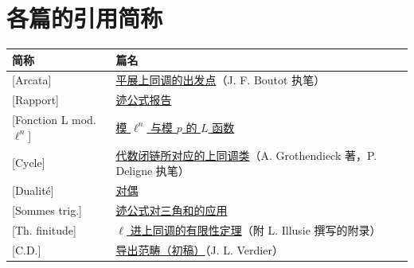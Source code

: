 \section*{各篇的引用简称}
\begin{longtable}{@{}p{.23\linewidth}p{.70\linewidth}@{}}
\toprule
\textbf{简称} & \textbf{篇名}\\\midrule
{[Arcata]} & \hyperref[I]{平展上同调的出发点}（J. F. Boutot 执笔）\\[3pt]
{[Rapport]} & \hyperref[II]{迹公式报告}\\[3pt]
{[Fonction L mod.$\ell^n$]} & \hyperref[III]{模 $\ell^n$ 与模 $p$ 的 $L$ 函数}\\[3pt]
{[Cycle]} & \hyperref[IV]{代数闭链所对应的上同调类}（A. Grothendieck 著，P. Deligne 执笔）\\[3pt]
{[Dualité]} & \hyperref[V]{对偶}\\[3pt]
{[Sommes trig.]} & \hyperref[VI]{迹公式对三角和的应用}\\[3pt]
{[Th. finitude]} & \hyperref[VII]{$\ell$ 进上同调的有限性定理}（附 L. Illusie 撰写的附录）\\[3pt]
{[C.D.]} & \hyperref[VIII]{导出范畴（初稿）}（J. L. Verdier）\\
\bottomrule
\end{longtable}
